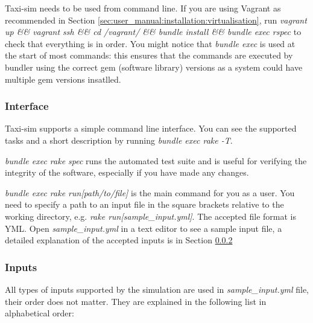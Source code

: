Taxi-sim needs to be used from command line. If you are using Vagrant as
recommended in Section \ref{sec:user_manual:installation:virtualisation}, run
\textit{vagrant up \&\& vagrant ssh \&\& cd /vagrant/ \&\& bundle install \&\&
bundle exec rspec} to check that everything is in order. You might notice that
\textit{bundle exec} is used at the start of most commands: this ensures that
the commands are executed by bundler using the correct gem (software library)
versions as a system could have multiple gem versions insatlled.


\subsubsection{Interface}
\label{sec:user_manual:using:interface}

Taxi-sim supports a simple command line interface. You can see the supported
tasks and a short description by running \textit{bundle exec rake -T}.

\textit{bundle exec rake spec} runs the automated test suite and is useful for
verifying the integrity of the software, especially if you have made any
changes.

\textit{bundle exec rake run[path/to/file]} is the main command for you as a
user. You need to specify a path to an input file in the square brackets
relative to the working directory, e.g. \textit{rake run[sample\_input.yml]}.
The accepted file format is YML. Open \textit{sample\_input.yml} in a text
editor to see a sample input file, a detailed explanation of the accepted
inputs is in Section \ref{sec:user_manual:using:inputs}


\subsubsection{Inputs}
\label{sec:user_manual:using:inputs}

All types of inputs supported by the simulation are used in
\textit{sample\_input.yml} file, their order does not matter. They are explained
in the following list in alphabetical order:

